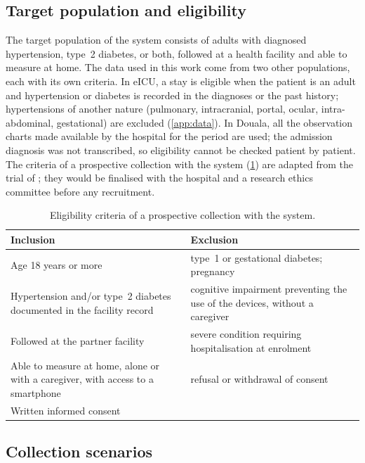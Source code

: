 \subsection{Target population and eligibility}\label{sec:eligibility}

The target population of the system consists of adults with diagnosed hypertension, type~2 diabetes, or both, followed at a health facility and able to measure at home. The data used in this work come from two other populations, each with its own criteria. In eICU, a stay is eligible when the patient is an adult and hypertension or diabetes is recorded in the diagnoses or the past history; hypertensions of another nature (pulmonary, intracranial, portal, ocular, intra-abdominal, gestational) are excluded (\cref{app:data}). In Douala, all the observation charts made available by the hospital for the period are used; the admission diagnosis was not transcribed, so eligibility cannot be checked patient by patient. The criteria of a prospective collection with the system (\cref{tab:eligibility}) are adapted from the trial of \textcite{mihevc2025}; they would be finalised with the hospital and a research ethics committee before any recruitment.

\begin{table}[htbp]
\centering\small
\caption{Eligibility criteria of a prospective collection with the system.}\label{tab:eligibility}
\begin{tabularx}{\textwidth}{@{}X X@{}}
\toprule
\textbf{Inclusion} & \textbf{Exclusion} \\
\midrule
Age 18 years or more & type~1 or gestational diabetes; pregnancy \\
Hypertension and/or type~2 diabetes documented in the facility record & cognitive impairment preventing the use of the devices, without a caregiver \\
Followed at the partner facility & severe condition requiring hospitalisation at enrolment \\
Able to measure at home, alone or with a caregiver, with access to a smartphone & refusal or withdrawal of consent \\
Written informed consent & \\
\bottomrule
\end{tabularx}
\end{table}

\subsection{Collection scenarios}\label{sec:scenarios}

